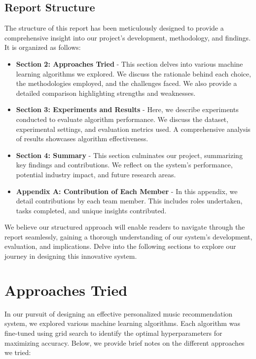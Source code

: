 \documentclass[a4paper, 24pt]{article}
\begin{document}
\subsection{Report Structure}

The structure of this report has been meticulously designed to provide a comprehensive insight into our project's development, methodology, and findings. It is organized as follows:

\begin{itemize}
\item \textbf{Section 2: Approaches Tried} - 
This section delves into various machine learning algorithms we explored. We discuss the rationale behind each choice, the methodologies employed, and the challenges faced. We also provide a detailed comparison highlighting strengths and weaknesses.

\item \textbf{Section 3: Experiments and Results} - 
Here, we describe experiments conducted to evaluate algorithm performance. We discuss the dataset, experimental settings, and evaluation metrics used. A comprehensive analysis of results showcases algorithm effectiveness.

\item \textbf{Section 4: Summary} - 
This section culminates our project, summarizing key findings and contributions. We reflect on the system's performance, potential industry impact, and future research areas. 

\item \textbf{Appendix A: Contribution of Each Member} - 
In this appendix, we detail contributions by each team member. This includes roles undertaken, tasks completed, and unique insights contributed. 
\end{itemize}


We believe our structured approach will enable readers to navigate through the report seamlessly, gaining a thorough understanding of our system's development, evaluation, and implications. Delve into the following sections to explore our journey in designing this innovative system.


\section{Approaches Tried}
\label{sec:app}
In our pursuit of designing an effective personalized music recommendation system, we explored various machine learning algorithms. Each algorithm was fine-tuned using grid search to identify the optimal hyperparameters for maximizing accuracy. Below, we provide brief notes on the different approaches we tried:
\end{document}
